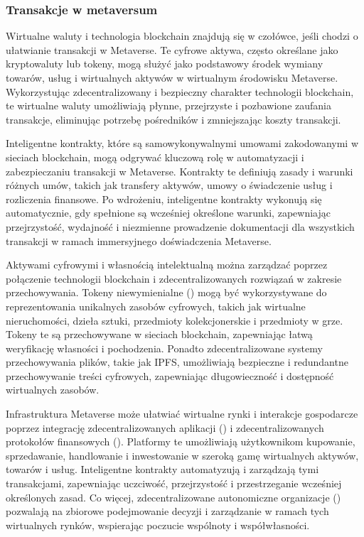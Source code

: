 \subsubsection{Transakcje w metaversum}

Wirtualne waluty i technologia blockchain znajdują się w czołówce, jeśli chodzi o ułatwianie transakcji w Metaverse. Te cyfrowe aktywa, często określane jako kryptowaluty lub tokeny, mogą służyć jako podstawowy środek wymiany towarów, usług i wirtualnych aktywów w wirtualnym środowisku Metaverse. Wykorzystując zdecentralizowany i bezpieczny charakter technologii blockchain, te wirtualne waluty umożliwiają płynne, przejrzyste i pozbawione zaufania transakcje, eliminując potrzebę pośredników i zmniejszając koszty transakcji\cite{metaverseInfrastructureIEEE}.

Inteligentne kontrakty, które są samowykonywalnymi umowami zakodowanymi w sieciach blockchain, mogą odgrywać kluczową rolę w automatyzacji i zabezpieczaniu transakcji w Metaverse. Kontrakty te definiują zasady i warunki różnych umów, takich jak transfery aktywów, umowy o świadczenie usług i rozliczenia finansowe. Po wdrożeniu, inteligentne kontrakty wykonują się automatycznie, gdy spełnione są wcześniej określone warunki, zapewniając przejrzystość, wydajność i niezmienne prowadzenie dokumentacji dla wszystkich transakcji w ramach immersyjnego doświadczenia Metaverse\cite{metaverseInfrastructureIEEE}.

Aktywami cyfrowymi i własnością intelektualną można zarządzać poprzez połączenie technologii blockchain i zdecentralizowanych rozwiązań w zakresie przechowywania. Tokeny niewymienialne  () mogą być wykorzystywane do reprezentowania unikalnych zasobów cyfrowych, takich jak wirtualne nieruchomości, dzieła sztuki, przedmioty kolekcjonerskie i przedmioty w grze. Tokeny te są przechowywane w sieciach blockchain, zapewniając łatwą weryfikację własności i pochodzenia. Ponadto zdecentralizowane systemy przechowywania plików, takie jak IPFS, umożliwiają bezpieczne i redundantne przechowywanie treści cyfrowych, zapewniając długowieczność i dostępność wirtualnych zasobów\cite{metaverseInfrastructureIEEE}.

Infrastruktura Metaverse może ułatwiać wirtualne rynki i interakcje gospodarcze poprzez integrację zdecentralizowanych aplikacji  () i zdecentralizowanych protokołów finansowych  (). Platformy te umożliwiają użytkownikom kupowanie, sprzedawanie, handlowanie i inwestowanie w szeroką gamę wirtualnych aktywów, towarów i usług. Inteligentne kontrakty automatyzują i zarządzają tymi transakcjami, zapewniając uczciwość, przejrzystość i przestrzeganie wcześniej określonych zasad. Co więcej, zdecentralizowane autonomiczne organizacje  () pozwalają na zbiorowe podejmowanie decyzji i zarządzanie w ramach tych wirtualnych rynków, wspierając poczucie wspólnoty i współwłasności\cite{metaverseInfrastructureIEEE}.

